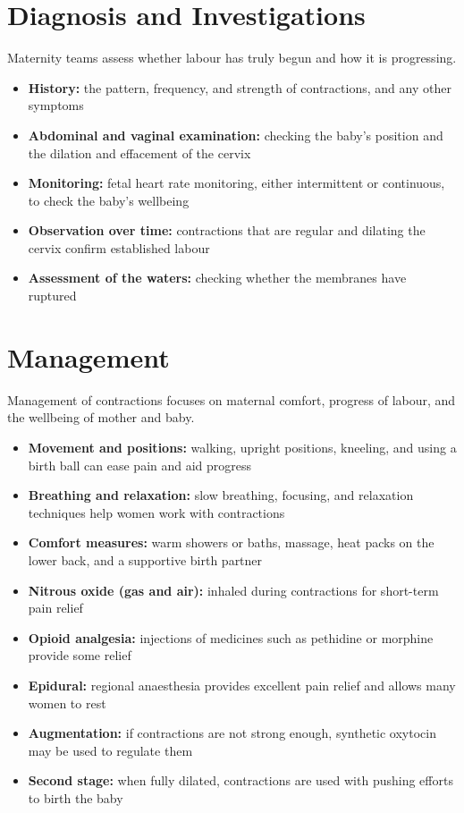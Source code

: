 \section*{Diagnosis and Investigations}
Maternity teams assess whether labour has truly begun and how it is progressing.

\begin{itemize}
    \item \textbf{History:} the pattern, frequency, and strength of contractions, and any other symptoms
    \item \textbf{Abdominal and vaginal examination:} checking the baby's position and the dilation and effacement of the cervix
    \item \textbf{Monitoring:} fetal heart rate monitoring, either intermittent or continuous, to check the baby's wellbeing
    \item \textbf{Observation over time:} contractions that are regular and dilating the cervix confirm established labour
    \item \textbf{Assessment of the waters:} checking whether the membranes have ruptured
\end{itemize}

\section*{Management}
Management of contractions focuses on maternal comfort, progress of labour, and the wellbeing of mother and baby.

\begin{itemize}
    \item \textbf{Movement and positions:} walking, upright positions, kneeling, and using a birth ball can ease pain and aid progress
    \item \textbf{Breathing and relaxation:} slow breathing, focusing, and relaxation techniques help women work with contractions
    \item \textbf{Comfort measures:} warm showers or baths, massage, heat packs on the lower back, and a supportive birth partner
    \item \textbf{Nitrous oxide (gas and air):} inhaled during contractions for short-term pain relief
    \item \textbf{Opioid analgesia:} injections of medicines such as pethidine or morphine provide some relief
    \item \textbf{Epidural:} regional anaesthesia provides excellent pain relief and allows many women to rest
    \item \textbf{Augmentation:} if contractions are not strong enough, synthetic oxytocin may be used to regulate them
    \item \textbf{Second stage:} when fully dilated, contractions are used with pushing efforts to birth the baby
\end{itemize}


